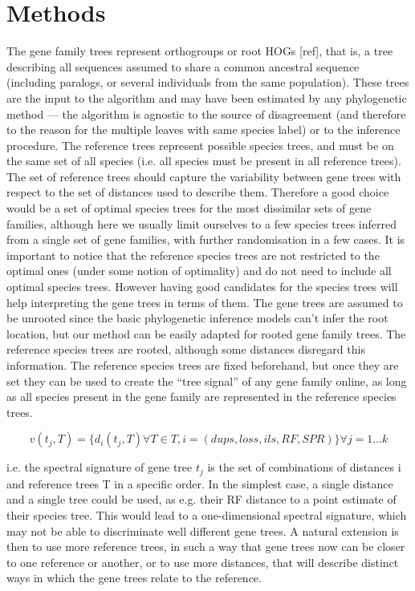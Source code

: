 \section{Methods}
The gene family trees represent orthogroups or root HOGs [ref], that is, a tree describing all sequences assumed to
share a common ancestral sequence (including paralogs, or several individuals from the same population). 
These trees are
the input to the algorithm and may have been estimated by any phylogenetic method --- the algorithm is agnostic to the
source of disagreement (and therefore to the reason for the multiple leaves with same species label) or to the inference
procedure. 
The reference trees represent possible species trees, and must be on the same set of all species (i.e. all
species must be present in all reference trees). 
The set of reference trees should capture the variability between gene
trees with respect to the set of distances used to describe them. 
Therefore a good choice would be a set of optimal
species trees for the most dissimilar sets of gene families, although here we usually limit ourselves to a few species
trees inferred from a single set of gene families, with further randomisation in a few cases. 
It is important to notice
that the reference species trees are not restricted to the optimal ones (under some notion of optimality) and do not
need to include all optimal species trees. 
However having good candidates for the species trees will help interpreting
the gene trees in terms of them. 
The gene trees are assumed to be unrooted since the basic phylogenetic inference models
can’t infer the root location, but our method can be easily adapted for rooted gene family trees.
The reference species
trees are rooted, although some distances disregard this information.
The reference species trees are fixed beforehand,
but once they are set they can be used to create the ``tree signal'' of any gene family online, as long as all species
present in the gene family are represented in the reference species trees.

\begin{equation}
v(t_j,T) = \{d_i(t_j, T) \forall T \in T, i=\left(dups, loss, ils, RF, SPR\right) \} \forall j=1\dots k
\end{equation}


i.e. the spectral signature of gene tree $t_j$ is the set of combinations of distances i and reference trees T in a
specific order. In the simplest case, a single distance and a single tree could be used, as e.g. their RF distance to a
point estimate of their species tree. This would lead to a one-dimensional spectral signature, which may not be able to
discriminate well different gene trees. A natural extension is then to use more reference trees, in such a way that gene
trees now can be closer to one reference or another, or to use more distances, that will describe distinct ways in which
the gene trees relate to the reference.

